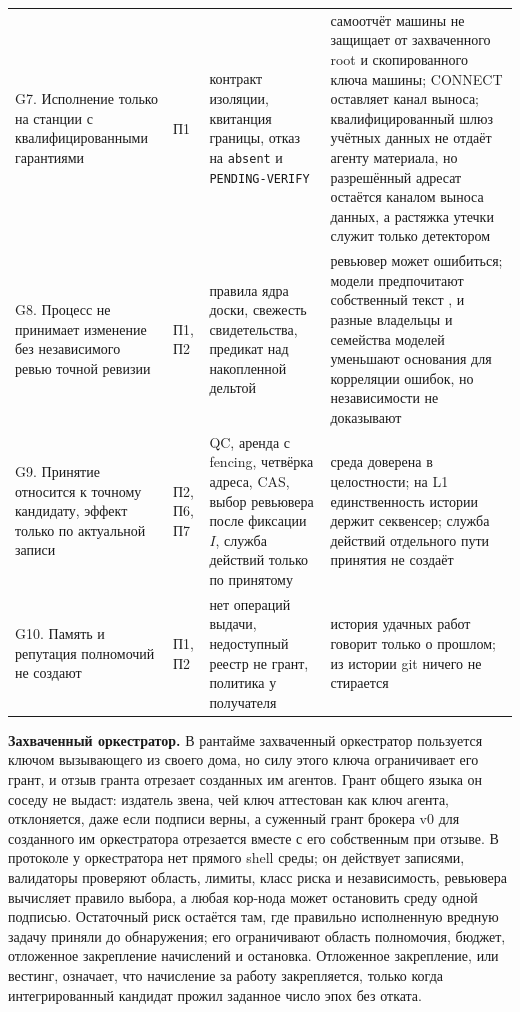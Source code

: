 \documentclass[10pt,a4paper]{article}
\begin{document}
\begin{table}[t]
\begin{tabular}{L{3.3cm}L{1.15cm}L{3.9cm}L{5.95cm}}
\addlinespace
G7. Исполнение только на станции с квалифицированными гарантиями & П1 & контракт изоляции, квитанция границы, отказ на \texttt{absent} и \texttt{PENDING-VERIFY} & самоотчёт машины не защищает от захваченного root и скопированного ключа машины; CONNECT оставляет канал выноса; квалифицированный шлюз учётных данных не отдаёт агенту материала, но разрешённый адресат остаётся каналом выноса данных, а растяжка утечки служит только детектором \\
\addlinespace
G8. Процесс не принимает изменение без независимого ревью точной ревизии & П1, П2 & правила ядра доски, свежесть свидетельства, предикат над накопленной дельтой & ревьювер может ошибиться; модели предпочитают собственный текст \cite{selfpref}, и разные владельцы и семейства моделей уменьшают основания для корреляции ошибок, но независимости не доказывают \\
\addlinespace
G9. Принятие относится к точному кандидату, эффект только по актуальной записи & П2, П6, П7 & QC, аренда с fencing, четвёрка адреса, CAS, выбор ревьювера после фиксации $I$, служба действий только по принятому & среда доверена в целостности; на L1 единственность истории держит секвенсер; служба действий отдельного пути принятия не создаёт \\
\addlinespace
G10. Память и репутация полномочий не создают & П1, П2 & нет операций выдачи, недоступный реестр не грант, политика у получателя & история удачных работ говорит только о прошлом; из истории git ничего не стирается \\
\bottomrule
\end{tabular}
\end{table}

\textbf{Захваченный оркестратор.} В рантайме захваченный оркестратор пользуется ключом вызывающего из своего дома, но силу этого ключа ограничивает его грант, и отзыв гранта отрезает созданных им агентов. Грант общего языка он соседу не выдаст: издатель звена, чей ключ аттестован как ключ агента, отклоняется, даже если подписи верны, а суженный грант брокера v0 для созданного им оркестратора отрезается вместе с его собственным при отзыве. В протоколе у оркестратора нет прямого shell среды; он действует записями, валидаторы проверяют область, лимиты, класс риска и независимость, ревьювера вычисляет правило выбора, а любая кор-нода может остановить среду одной подписью. Остаточный риск остаётся там, где правильно исполненную вредную задачу приняли до обнаружения; его ограничивают область полномочия, бюджет, отложенное закрепление начислений и остановка. Отложенное закрепление, или вестинг, означает, что начисление за работу закрепляется, только когда интегрированный кандидат прожил заданное число эпох без отката.
\end{document}
